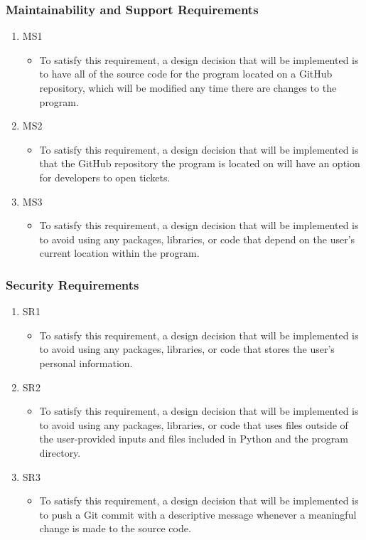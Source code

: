 \documentclass[12pt, titlepage]{article}
\begin{document}
\subsubsection{Maintainability and Support Requirements}

\begin{enumerate}
    \item MS1
    \begin{itemize}
        \item To satisfy this requirement, a design decision that will be implemented is to have all of the source code for the program located on a GitHub repository, which will be modified any time there are changes to the program.
    \end{itemize}
    \item MS2
    \begin{itemize}
        \item To satisfy this requirement, a design decision that will be implemented is that the GitHub repository the program is located on will have an option for developers to open tickets.
    \end{itemize}
    \item MS3
    \begin{itemize}
        \item To satisfy this requirement, a design decision that will be implemented is to avoid using any packages, libraries, or code that depend on the user's current location within the program.
    \end{itemize}
\end{enumerate}

\subsubsection{Security Requirements}

\begin{enumerate}
    \item SR1
    \begin{itemize}
        \item To satisfy this requirement, a design decision that will be implemented is to avoid using any packages, libraries, or code that stores the user's personal information.
    \end{itemize}
    \item SR2
    \begin{itemize}
        \item To satisfy this requirement, a design decision that will be implemented is to avoid using any packages, libraries, or code that uses files outside of the user-provided inputs and files included in Python and the program directory.
    \end{itemize}
    \item SR3
    \begin{itemize}
        \item To satisfy this requirement, a design decision that will be implemented is to push a Git commit with a descriptive message whenever a meaningful change is made to the source code.
    \end{itemize}
\end{enumerate}
\end{document}

